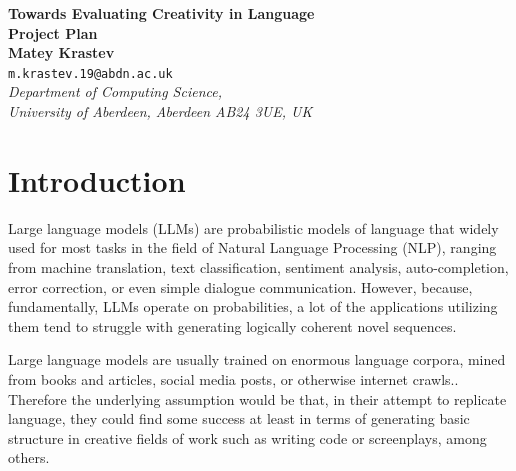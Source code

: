 \documentclass[a4paper,12pt]{article}
\newcommand{\ajs}[1]{\textcolor{orange}{[AJS: #1]}}
\begin{document}
\begin{center}
{\Large\bf{Towards Evaluating Creativity in Language}} \\
      \vspace{5.0mm}
{\Large\bf{Project Plan}} \\
      \vspace{8mm}
      {\large\bf{Matey Krastev}}  \\
      \vspace{5.0mm}
       {\tt m.krastev.19@abdn.ac.uk} \\
      \vspace{5.0mm}
      {\em Department of Computing Science,\\
       University of Aberdeen, Aberdeen AB24 3UE, UK} 
\end{center}


\section*{Introduction}

Large language models (LLMs) are probabilistic models of language that widely used for most tasks in the field of Natural Language Processing (NLP), ranging from machine translation, text classification, sentiment analysis, auto-completion, error correction, or even simple dialogue communication. However, because, fundamentally, LLMs operate on probabilities, a lot of the applications utilizing them tend to struggle with generating logically coherent novel sequences. 

Large language models are usually trained on enormous language corpora, mined from books and articles\cite{gutenberg_dataset}, social media posts\cite{broad_twitter}, or otherwise internet crawls.\cite{thepile_dataset}. Therefore the underlying assumption would be that, in their attempt to replicate language, they could find some success at least in terms of generating basic structure in creative fields of work such as writing code\cite{codex_2021_copilot} or screenplays\cite{mirowski_co-writing_2022}, among others. 
\end{document}

